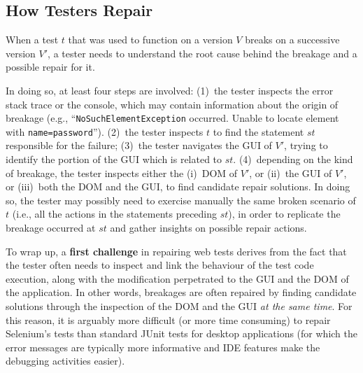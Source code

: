 

\subsection{How Testers Repair}

When a test $t$ that was used to function on a version $V$  breaks on a successive version $V'$, a tester needs to understand the root cause behind the breakage and a possible repair for it. 

In doing so, at least four steps are involved: 
(1)~the tester inspects the error stack trace or the console, which may contain information about the origin of breakage (e.g., ``\texttt{NoSuchElementException} occurred. Unable to locate element with \mbox{\texttt{name=password}}''). 
(2)~the tester inspects $t$ to find the statement $st$ responsible for the failure; %
(3)~the tester navigates the GUI of $V'$, trying to identify the portion of the GUI which is related to $st$. 
(4)~depending on the kind of breakage, the tester inspects either the (i)~DOM of $V'$, or (ii)~the GUI of $V'$, or (iii)~both the DOM and the GUI, to find candidate repair solutions. In doing so, the tester may possibly need to exercise manually the same broken scenario of $t$ (i.e., all the actions in the statements preceding $st$), in order to replicate the breakage occurred at $st$ and gather insights on possible repair actions.

To wrap up, a \textbf{first challenge} in repairing web tests derives from the fact that  
the tester often needs to inspect and link the behaviour of the test code execution, along with the modification perpetrated to the GUI and the DOM of the application. 
In other words, breakages are often repaired by finding candidate solutions through the inspection of the DOM and the GUI \textit{at the same time}.
For this reason, it is arguably more difficult (or more time consuming) to repair Selenium's tests than standard JUnit tests for desktop applications (for which the error messages are typically more informative and IDE features make the debugging activities easier).

